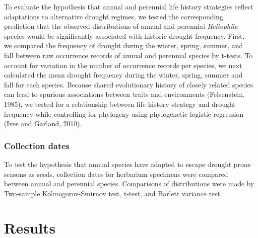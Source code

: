 \documentclass[man,floatsintext]{apa6}
\theoremstyle{definition}
\theoremstyle{definition}
\theoremstyle{definition}
\theoremstyle{remark}
\begin{document}
To evaluate the hypothesis that annual and perennial life history
strategies reflect adaptations to alternative drought regimes, we tested
the corresponding prediction that the observed distributions of annual
and perennial \emph{Heliophila} species would be significantly
associated with historic drought frequency. First, we compared the
frequency of drought during the winter, spring, summer, and fall between
raw occurrence records of annual and perennial species by t-tests. To
account for variation in the number of occurrence records per species,
we next calculated the mean drought frequency during the winter, spring,
summer and fall for each species. Because shared evolutionary history of
closely related species can lead to spurious associations between traits
and environments (Felsenstein, 1985), we tested for a relationship
between life history strategy and drought frequency while controlling
for phylogeny using phylogenetic logistic regression (Ives and Garland,
2010).

\hypertarget{collection-dates}{%
\subsubsection{Collection dates}\label{collection-dates}}

To test the hypothesis that annual species have adapted to escape
drought prone seasons as seeds, collection dates for herbarium specimens
were compared between annual and perennial species. Comparisons of
distributions were made by Two-sample Kolmogorov-Smirnov test, t-test,
and Barlett variance test.

\hypertarget{results}{%
\section{Results}\label{results}}
\end{document}
